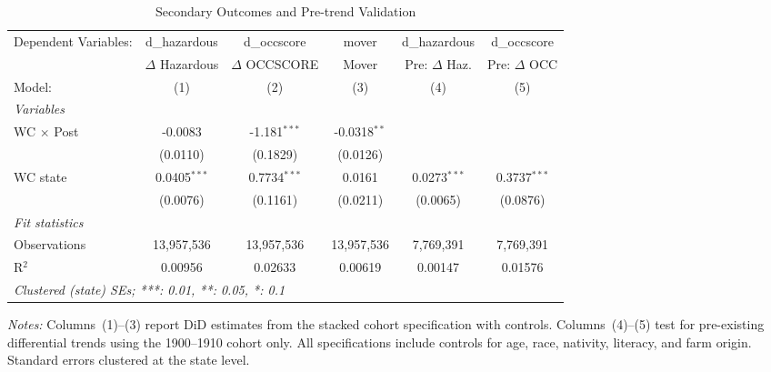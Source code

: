 
\begin{table}[htbp]
   \caption{\label{tab:outcomes} Secondary Outcomes and Pre-trend Validation}
   \centering
   \footnotesize
   \setlength{\tabcolsep}{3pt}
   \begin{tabular}{lccccc}
      \tabularnewline \midrule \midrule
      Dependent Variables: & d\_hazardous        & d\_occscore        & mover          & d\_hazardous        & d\_occscore\\   
                           & $\Delta$ Hazardous  & $\Delta$ OCCSCORE  & Mover          & Pre: $\Delta$ Haz.  & Pre: $\Delta$ OCC \\    
      Model:               & (1)                 & (2)                & (3)            & (4)                 & (5)\\  
      \midrule
      \emph{Variables}\\
      WC $\times$ Post     & -0.0083             & -1.181$^{***}$     & -0.0318$^{**}$ &                     &   \\   
                           & (0.0110)            & (0.1829)           & (0.0126)       &                     &   \\   
      WC state             & 0.0405$^{***}$      & 0.7734$^{***}$     & 0.0161         & 0.0273$^{***}$      & 0.3737$^{***}$\\   
                           & (0.0076)            & (0.1161)           & (0.0211)       & (0.0065)            & (0.0876)\\   
      \midrule
      \emph{Fit statistics}\\
      Observations         & 13,957,536          & 13,957,536         & 13,957,536     & 7,769,391           & 7,769,391\\  
      R$^2$                & 0.00956             & 0.02633            & 0.00619        & 0.00147             & 0.01576\\  
      \midrule \midrule
      \multicolumn{6}{l}{\emph{Clustered (state) SEs; ***: 0.01, **: 0.05, *: 0.1}}\\
   \end{tabular}

   \par \raggedright \footnotesize
   \textit{Notes:} Columns~(1)--(3) report DiD estimates from the stacked cohort specification with controls. Columns~(4)--(5) test for pre-existing differential trends using the 1900--1910 cohort only. All specifications include controls for age, race, nativity, literacy, and farm origin. Standard errors clustered at the state level.
\end{table}


